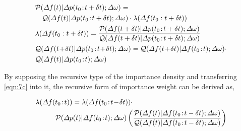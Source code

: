 \documentclass[lettersize,journal]{IEEEtran}
\begin{document}
\begin{newsubequations}\label{eqn:7}
	\begin{align}
		 & \mathcal{P}(\varDelta f(t)|\varDelta p(t_0\!:\!t+\delta t);\varDelta \omega)=\label{eqn:7a}                                                                                                                                                     \\
		 & \quad \mathcal{Q}(\varDelta f(t)|\varDelta p(t_0\!:\!t+\delta t);\varDelta \omega) \cdot \lambda (\varDelta f(t_0:t+\delta t))\notag                                                                                                            \\
		 & \lambda (\varDelta f(t_0:t+\delta t)) = \frac{\mathcal{P} (\varDelta f(t+\delta t) | \varDelta p(t_0\!:\!t+\delta t);\varDelta \omega)}{\mathcal{Q} (\varDelta f(t+\delta t) | \varDelta p(t_0\!:\!t+\delta t);\varDelta \omega)}\label{eqn:7b} \\
		 & \mathcal{Q} (\varDelta f(t\!+\!\delta t) | \varDelta p(t_0\!:\!t\!+\!\delta t);\varDelta \omega) = \mathcal{Q}(\varDelta f(t\!+\!\delta t)|\varDelta f(t_0\!:\!t); \varDelta \omega)\cdot \notag                                                \\
		 & \mathcal{Q}(\varDelta f(t)|\varDelta p(t_0\!:\!t);\varDelta \omega)  \label{eqn:7c}
	\end{align}
\end{newsubequations}

By supposing the recursive type of the importance density and transferring \eqref{eqn:7c} into it, the recursive form of importance weight can be derived as,

\vspace{-0.125in}
\begin{newsubequations}
	\begin{align}
		 & \lambda(\varDelta f(t_0\!:\!t)) = \lambda(\varDelta f(t_0\!:\!t\!-\!\delta t))\cdot \label{eqn:8a}                                                                                                                                                                        \\
		 & \qquad\,\,\,\,\, \mathcal{P}(\varDelta p(t)|\varDelta f(t_0\!:\!t);\varDelta \omega)\left(\frac{\mathcal{P}(\varDelta f(t)|\varDelta f(t_0\!:\!t-\delta t);\varDelta \omega)}{\mathcal{Q}(\varDelta f(t)|\varDelta f(t_0\!:\!t-\delta t);\varDelta \omega)}\right) \notag
	\end{align} \end{newsubequations}
\end{document}
